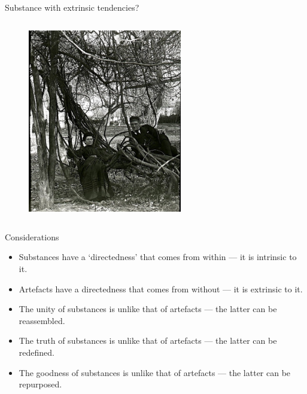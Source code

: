 \documentclass[xcolor=dvipsnames]{beamer}
\begin{document}
\begin{frame}[fragile]{Substance with extrinsic tendencies?}
  \begin{columns}[T] %
    \begin{column}{0.99\textwidth}
      \begin{figure}[H]
        \centering
        \includegraphics[width=0.6\textwidth]{vine-hammock}
      \end{figure}
    \end{column}%
  \end{columns}
\end{frame}


\begin{frame}[fragile]{Considerations}
  \begin{itemize}
  \item Substances have a `directedness' that comes from within --- it is intrinsic to it.\vspace{5mm}
  \item Artefacts have a directedness that comes from without --- it is extrinsic to it.\vspace{5mm}
  \item The unity of substances is unlike that of artefacts --- the latter can be reassembled.\vspace{5mm}
  \item The truth of substances is unlike that of artefacts --- the latter can be redefined.\vspace{5mm}
  \item The goodness of substances is unlike that of artefacts --- the latter can be repurposed.\vspace{5mm}
  \end{itemize}
\end{frame}


\begin{frame}[plain]
  \titlepage
\end{frame}
\end{document}
